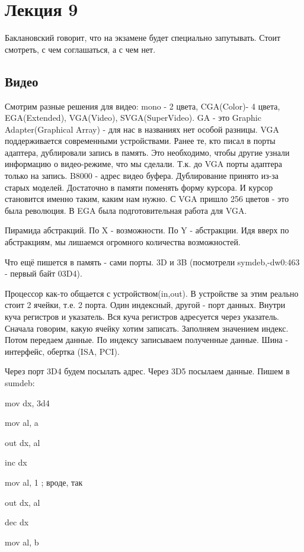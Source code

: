 \section{Лекция 9}
\begin{rem} Баклановский говорит, что на экзамене будет специально запутывать. Стоит смотреть, с чем соглашаться, а с чем нет.\end{rem}
\subsection{Видео}
Смотрим разные решения для видео: mono - 2 цвета, CGA(Color)- 4 цвета, EGA(Extended), VGA(Video), SVGA(SuperVideo). GA - это Graphic Adapter(Graphical Array) - для нас в названиях нет особой разницы. VGA  поддерживается современными устройствами. Ранее те, кто писал в порты адаптера, дублировали запись в память. Это необходимо, чтобы другие узнали информацию о видео-режиме, что мы сделали. Т.к. до VGA порты адаптера только на запись. B8000 - адрес видео буфера. Дублирование принято из-за старых моделей. Достаточно в памяти поменять форму курсора. И курсор становится именно таким, каким нам нужно. С VGA пришло 256 цветов - это была революция. В EGA была подготовительная работа для VGA.

Пирамида абстракций. По X - возможности. По Y - абстракции. Идя вверх по абстракциям, мы лишаемся огромного количества возможностей. 

Что ещё пишется в память - сами порты. 3D и 3B (посмотрели symdeb,-dw0:463 - первый байт 03D4).

Процессор как-то общается с устройством(in,out). В устройстве за этим реально стоит 2 ячейки, т.е. 2 порта. Один индексный, другой - порт данных. Внутри куча регистров и указатель. Вся куча регистров адресуется через указатель. Сначала говорим, какую ячейку хотим записать. Заполняем значением индекс. Потом передаем данные. По индексу записываем полученные данные. Шина - интерфейс, обертка (ISA, PCI).


Через порт 3D4 будем посылать адрес. Через 3D5 посылаем данные. Пишем в sumdeb:

mov dx, 3d4

mov al, a

out dx, al

inc dx

mov al, 1  ; вроде, так

out dx, al

dec dx

mov al, b

